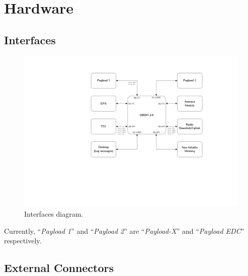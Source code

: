 %
%
%
%
%

%
%
%
%
%
%

\chapter{Hardware} \label{ch:hardware}

\section{Interfaces}

\begin{figure}[!ht]
    \begin{center}
        \includegraphics[width=\textwidth]{figures/diagram_interfaces.pdf}
        \caption{Interfaces diagram.}
        \label{fig:diagram-interfaces}
    \end{center}
\end{figure}

Currently, ``\textit{Payload 1}'' and ``\textit{Payload 2}'' are ``\textit{Payload-X}'' and ``\textit{Payload EDC}'' respectively.

\section{External Connectors}

